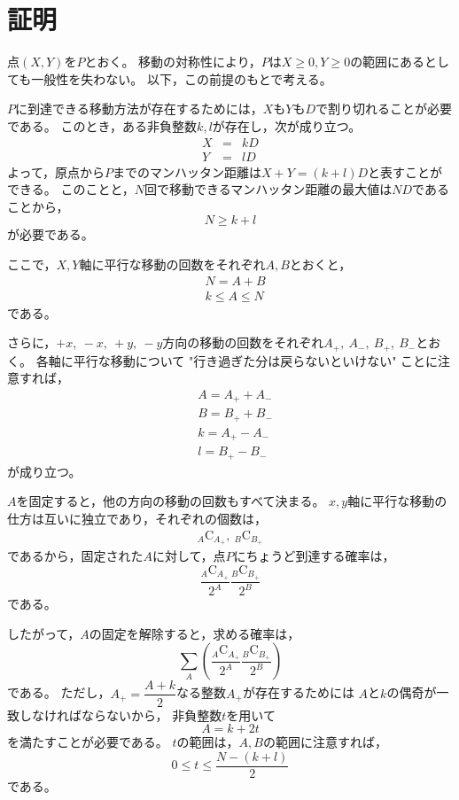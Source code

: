 \documentclass{article}
\begin{document}
\section{証明}

点$(X, Y)$を$P$とおく。
移動の対称性により，$P$は$X \geq 0, Y \geq 0$の範囲にあるとしても一般性を失わない。
以下，この前提のもとで考える。

$P$に到達できる移動方法が存在するためには，$X$も$Y$も$D$で割り切れることが必要である。
このとき，ある非負整数$k, l$が存在し，次が成り立つ。
\begin{eqnarray*}
    X &=& kD \\
    Y &=& lD
\end{eqnarray*}
よって，原点から$P$までのマンハッタン距離は$X + Y = (k + l)D$と表すことができる。
このことと，$N$回で移動できるマンハッタン距離の最大値は$ND$であることから，
\begin{equation*}
    N \geq k + l
\end{equation*}
が必要である。

ここで，$X, Y$軸に平行な移動の回数をそれぞれ$A, B$とおくと，
\begin{eqnarray*}
    &N = A + B \\
    &k \leq A \leq N
\end{eqnarray*}
である。

さらに，$+x,\ -x,\ +y,\ -y$方向の移動の回数をそれぞれ$A_+,\ A_-,\ B_+,\ B_-$とおく。
各軸に平行な移動について "行き過ぎた分は戻らないといけない" ことに注意すれば，
\begin{eqnarray*}
    &A = A_+ + A_- \\
    &B = B_+ + B_- \\
    &k = A_+ - A_- \\
    &l = B_+ - B_-
\end{eqnarray*}
が成り立つ。

$A$を固定すると，他の方向の移動の回数もすべて決まる。
$x, y$軸に平行な移動の仕方は互いに独立であり，それぞれの個数は，
\begin{eqnarray*}
    {}_A \mathrm{C}_{A_+},\ 
    {}_B \mathrm{C}_{B_+}
\end{eqnarray*}
であるから，固定された$A$に対して，点$P$にちょうど到達する確率は，
\begin{equation*}
    \dfrac{{}_A \mathrm{C}_{A_+}}{2^A}
    \dfrac{{}_B \mathrm{C}_{B_+}}{2^B}
\end{equation*}
である。

したがって，$A$の固定を解除すると，求める確率は，
\begin{equation}
    \label{answer}
    \sum_{A}
    \left(\dfrac{{}_A \mathrm{C}_{A_+}}{2^A}
    \dfrac{{}_B \mathrm{C}_{B_+}}{2^B}\right)
\end{equation}
である。
ただし，$A_+ = \dfrac{A + k}{2}$なる整数$A_+$が存在するためには
$A$と$k$の偶奇が一致しなければならないから，
非負整数$t$を用いて
\begin{equation*}
    A = k + 2t
\end{equation*}
を満たすことが必要である。
$t$の範囲は，$A, B$の範囲に注意すれば，
\begin{equation*}
    0 \leq t \leq \dfrac{N - (k + l)}{2}
\end{equation*}
である。
\end{document}
